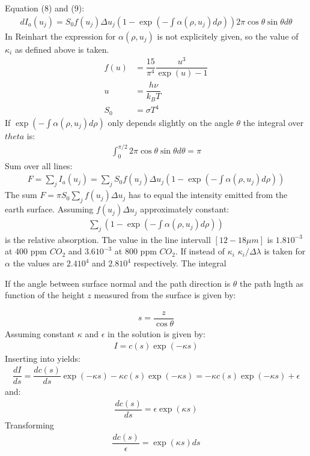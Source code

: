 Equation (8) and (9):
\begin{align}
    dI_a(u_j) = S_0 f(u_j) \Delta u_j \left(1 - \exp\left(-\int \alpha(\rho, u_j) d \rho\right) \right) 2 \pi \cos \theta \sin \theta d \theta
\end{align}
In Reinhart the expression for $\alpha(\rho, u_j)$ is not explicitely given, so the value of $\kappa_i$ as defined above is taken.
\begin{align}
    f(u) &= \dfrac{15}{\pi^4} \dfrac{u^3}{\exp(u) - 1} \\
    u    &= \dfrac{h \nu}{k_B T} \\
    S_0  &= \sigma T^4
\end{align}
If $\exp\left(-\int \alpha(\rho, u_j) d \rho\right)$ only depends slightly on the angle $\theta$ the integral over $theta$ is:
\begin{align}
    \int_{0}^{\pi/2} 2 \pi \cos \theta \sin \theta d \theta = \pi
\end{align}
Sum over all lines:
\begin{align}
    F = \sum_j I_a(u_j) = \sum_j S_0 f(u_j) \Delta u_j \left(1 - \exp\left(-\int \alpha(\rho, u_j) d \rho\right) \right)
\end{align}
The sum $F =  \pi S_0 \sum_j f(u_j) \Delta u_j$ has to equal the intensity emitted from the earth surface.
Assuming $f(u_j) \Delta u_j$ approximately constant:
\begin{align}
    \sum_j \left(1 - \exp\left(-\int \alpha(\rho, u_j) d \rho\right) \right)
\end{align}
is the relative absorption. The value in the line intervall $[12-18 \mu m]$ is $1.8 10^{-3}$ at 400 ppm $CO_2$ and $3.6  10^{-3}$ at 800 ppm $CO_2$.
If instead of $\kappa_i$ $\kappa_i / \Delta \lambda$ is taken for $\alpha$ the values are $2.4 10^4$ and $2.8 10^4$ respectively.
The integral

If the angle between surface normal and the path direction is $\theta$ the path lngth as function of the height $z$ measured from 
the surface is given by:

\begin{align}
	s = \dfrac{z}{\cos\theta}
\end{align}
Assuming constant $\kappa$ and $\epsilon$ in  the solution is given by:
\begin{align}
	I = c(s) \exp( - \kappa s)
\end{align}
Inserting into  yields:
\begin{align}
		\dfrac{d I}{d s} = \dfrac{d c(s)}{ds } \exp( - \kappa s) - \kappa c(s) \exp( - \kappa s) = - \kappa c(s) \exp( - \kappa s) + \epsilon
\end{align}
and:
\begin{align}
	\dfrac{d c(s)}{ds}  = \epsilon \exp(\kappa s)
\end{align}
Transforming
\begin{align}
	\dfrac{d c(s)}{\epsilon}  =  \exp(\kappa s) ds
\end{align}

